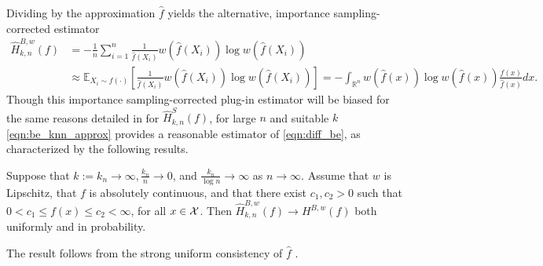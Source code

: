 %
Dividing by the approximation $\hat{f}$ yields the alternative, importance sampling-corrected estimator
%
\begin{align}
    \widehat{H}^{B,w}_{k,n}(f) &= - \frac{1}{n} \sum_{i=1}^n \frac{1}{\hat{f}(X_i)} w(\hat{f}(X_i)) \log w(\hat{f}(X_i)) \label{eqn:be_knn_approx} \\
    &\approx \mathbb{E}_{X_i \sim f(\cdot)} \left[ \frac{1}{\hat{f}(X_i)} w(\hat{f}(X_i)) \log w(\hat{f}(X_i)) \right] = - \int_{\mathbb{R}^n} w(\hat{f}(x)) \log w(\hat{f}(x)) \frac{f(x)}{\hat{f}(x)} dx. \nonumber
\end{align}
%
Though this importance sampling-corrected plug-in estimator will be biased for the same reasons detailed in \cite[Thm. 8]{singh2003nearest} for $\widehat{H}^S_{k,n}(f)$, for large $n$ and suitable $k$ \eqref{eqn:be_knn_approx} provides a reasonable estimator of \eqref{eqn:diff_be}, as characterized by the following results.

\begin{theorem} \label{thm:convergence}
    Suppose that $k := k_n \rightarrow \infty, \frac{k_n}{n} \rightarrow 0$, and $\frac{k_n}{\log n} \rightarrow \infty$ as $n \rightarrow \infty$. Assume that $w$ is Lipschitz, that $f$ is absolutely continuous, and that there exist $c_1, c_2 > 0$ such that $0 < c_1 \leq f(x) \leq c_2 < \infty$, for all $x \in \mathcal{X}$. Then $\widehat{H}^{B,w}_{k,n}(f) \rightarrow H^{B,w}(f)$ both uniformly and in probability.
\end{theorem}
%
The result follows from the strong uniform consistency of $\hat{f}$ \citep{devroye1977strong}.

